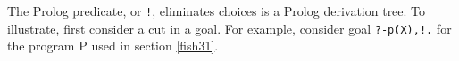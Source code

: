 \label{fish32}

The Prolog  predicate, or \verb'!', eliminates choices is a
Prolog derivation tree. To illustrate, first consider a cut in a goal. For
example, consider goal \verb|?-p(X),!.| for the program P used in section
\ref{fish31}.
